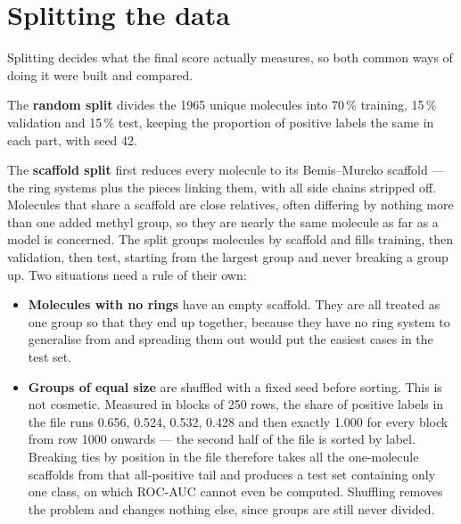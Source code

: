 \section{Splitting the data}
\label{part:split}

Splitting decides what the final score actually measures, so both common ways of doing it were built and compared.

The \textbf{random split} divides the 1965 unique molecules into 70\,\% training, 15\,\% validation and 15\,\% test, keeping the proportion of positive labels the same in each part, with seed 42.

The \textbf{scaffold split} first reduces every molecule to its Bemis--Murcko scaffold \parencite{Bemis} --- the ring systems plus the pieces linking them, with all side chains stripped off. Molecules that share a scaffold are close relatives, often differing by nothing more than one added methyl group, so they are nearly the same molecule as far as a model is concerned. The split groups molecules by scaffold and fills training, then validation, then test, starting from the largest group and never breaking a group up. Two situations need a rule of their own:

\begin{itemize}
    \item \textbf{Molecules with no rings} have an empty scaffold. They are all treated as one group so that they end up together, because they have no ring system to generalise from and spreading them out would put the easiest cases in the test set.
    \item \textbf{Groups of equal size} are shuffled with a fixed seed before sorting. This is not cosmetic. Measured in blocks of 250 rows, the share of positive labels in the file runs 0.656, 0.524, 0.532, 0.428 and then exactly 1.000 for every block from row 1000 onwards --- the second half of the file is sorted by label. Breaking ties by position in the file therefore takes all the one-molecule scaffolds from that all-positive tail and produces a test set containing only one class, on which ROC-AUC cannot even be computed. Shuffling removes the problem and changes nothing else, since groups are still never divided.
\end{itemize}

